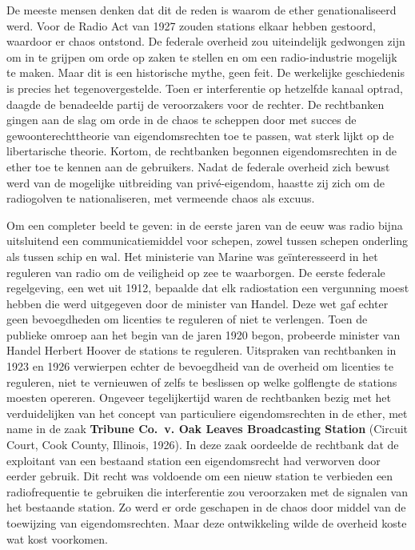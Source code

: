 \documentclass[
  a5paper,
  smalldemyvopaper,10pt,twoside,onecolumn,openright,extrafontsizes,hidelinks]{memoir}
\begin{document}
De meeste mensen denken dat dit de reden is waarom de ether
genationaliseerd werd. Voor de Radio Act van 1927 zouden stations elkaar
hebben gestoord, waardoor er chaos ontstond. De federale overheid zou
uiteindelijk gedwongen zijn om in te grijpen om orde op zaken te stellen
en om een radio-industrie mogelijk te maken. Maar dit is een historische
mythe, geen feit. De werkelijke geschiedenis is precies het
tegenovergestelde. Toen er interferentie op hetzelfde kanaal optrad,
daagde de benadeelde partij de veroorzakers voor de rechter. De
rechtbanken gingen aan de slag om orde in de chaos te scheppen door met
succes de gewoonterechttheorie van eigendomsrechten toe te passen, wat
sterk lijkt op de libertarische theorie. Kortom, de rechtbanken begonnen
eigendomsrechten in de ether toe te kennen aan de gebruikers. Nadat de
federale overheid zich bewust werd van de mogelijke uitbreiding van
privé-eigendom, haastte zij zich om de radiogolven te nationaliseren,
met vermeende chaos als excuus.

Om een completer beeld te geven: in de eerste jaren van de eeuw was
radio bijna uitsluitend een communicatiemiddel voor schepen, zowel
tussen schepen onderling als tussen schip en wal. Het ministerie van
Marine was geïnteresseerd in het reguleren van radio om de veiligheid op
zee te waarborgen. De eerste federale regelgeving, een wet uit 1912,
bepaalde dat elk radiostation een vergunning moest hebben die werd
uitgegeven door de minister van Handel. Deze wet gaf echter geen
bevoegdheden om licenties te reguleren of niet te verlengen. Toen de
publieke omroep aan het begin van de jaren 1920 begon, probeerde
minister van Handel Herbert Hoover de stations te reguleren. Uitspraken
van rechtbanken in 1923 en 1926 verwierpen echter de bevoegdheid van de
overheid om licenties te reguleren, niet te vernieuwen of zelfs te
beslissen op welke golflengte de stations moesten opereren. Ongeveer
tegelijkertijd waren de rechtbanken bezig met het verduidelijken van het
concept van particuliere eigendomsrechten in de ether, met name in de
zaak \textbf{Tribune Co.~v. Oak Leaves Broadcasting Station} (Circuit
Court, Cook County, Illinois, 1926). In deze zaak oordeelde de rechtbank
dat de exploitant van een bestaand station een eigendomsrecht had
verworven door eerder gebruik. Dit recht was voldoende om een nieuw
station te verbieden een radiofrequentie te gebruiken die interferentie
zou veroorzaken met de signalen van het bestaande station. Zo werd er
orde geschapen in de chaos door middel van de toewijzing van
eigendomsrechten. Maar deze ontwikkeling wilde de overheid koste wat
kost voorkomen.
\end{document}

